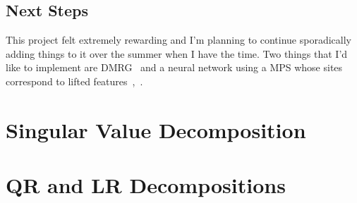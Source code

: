 \documentclass[12pt]{article}
\begin{document}
\begin{multicols}{2}
	\subsection{Next Steps}
	This project felt extremely rewarding and I'm planning to continue
	sporadically adding things to it over the summer when I have the
	time. Two things that I'd like to implement are DMRG~\cite{DMRG}
	and a neural network using a MPS whose sites correspond to lifted
	features~\cite{mps-ml},~\cite{Huggins}.





\appendix
\section{Singular Value Decomposition}
\section{QR and LR Decompositions}
\end{multicols}
\end{document}
